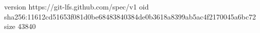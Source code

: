 version https://git-lfs.github.com/spec/v1
oid sha256:11612cd51653f081d0be68483840384de0b3618a8399ab5ac4f2170045a6bc72
size 43840
